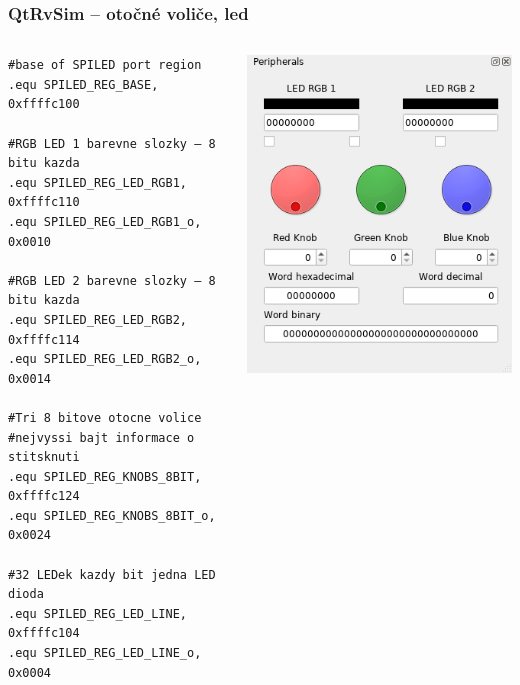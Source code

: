 \documentclass{beamer}
\begin{document}
\begin{frame}[fragile]
\frametitle{QtRvSim -- otočné voliče, led}

\begin{columns}
\begin{column}{0.6\textwidth}  
\begin{verbatim}
#base of SPILED port region
.equ SPILED_REG_BASE,       0xffffc100

#RGB LED 1 barevne slozky – 8 bitu kazda
.equ SPILED_REG_LED_RGB1,   0xffffc110
.equ SPILED_REG_LED_RGB1_o,   0x0010

#RGB LED 2 barevne slozky – 8 bitu kazda
.equ SPILED_REG_LED_RGB2,   0xffffc114
.equ SPILED_REG_LED_RGB2_o,   0x0014

#Tri 8 bitove otocne volice
#nejvyssi bajt informace o stitsknuti
.equ SPILED_REG_KNOBS_8BIT, 0xffffc124 
.equ SPILED_REG_KNOBS_8BIT_o, 0x0024

#32 LEDek kazdy bit jedna LED dioda
.equ SPILED_REG_LED_LINE,   0xffffc104
.equ SPILED_REG_LED_LINE_o,   0x0004
\end{verbatim}
\end{column}
\begin{column}{0.4\textwidth}
\includegraphics[width=\textwidth]{fig/knobs.png}
\end{column}
\end{columns}

\end{frame}
\end{document}
